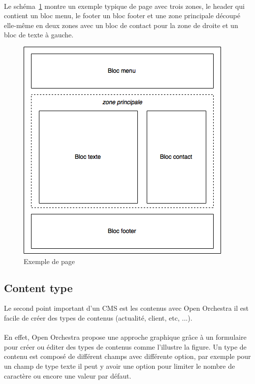          \paragraph{}
		Le schéma~\ref{node} montre un exemple typique de page avec trois zones, le header qui contient un bloc menu, le footer un bloc footer et une zone principale découpé elle-même en deux zones avec un bloc de contact pour la zone de droite et un bloc de texte à gauche.
		\begin{figure}[H]
        \begin{center}
          \includegraphics[scale=0.75]{images/node}
        \end{center}
        \caption{Exemple de page}
        \label{node}
      \end{figure}
         \subsection{Content type}
         Le second point important d'un CMS est les contenus avec Open Orchestra il est facile de créer des types de contenus (actualité, client, etc, ...).
          \paragraph{}
          En effet, Open Orchestra propose une approche graphique grâce à un formulaire pour créer ou éditer des types de contenus comme l'illustre la figure.
          Un type de contenu est composé de différent champs avec différente option, par exemple pour un champ de type texte il peut y avoir une option pour limiter le nombre de caractère ou encore une valeur par défaut.
